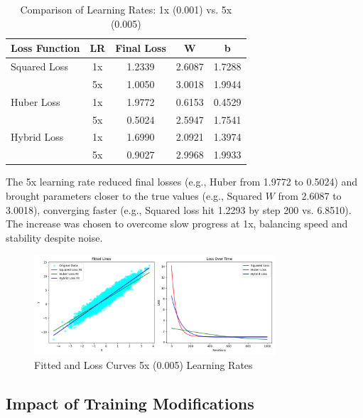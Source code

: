 \documentclass{article}
\begin{document}
\begin{table}[H]
    \centering
    \caption{Comparison of Learning Rates: 1x (0.001) vs. 5x (0.005)}
    \label{tab:lr_comparison}
    \begin{tabular}{lcccc}
        \toprule
        \textbf{Loss Function} & \textbf{LR} & \textbf{Final Loss} & \textbf{W} & \textbf{b} \\
        \midrule
        Squared Loss & 1x  & 1.2339 & 2.6087 & 1.7288 \\
                     & 5x  & 1.0050 & 3.0018 & 1.9944 \\
        Huber Loss   & 1x  & 1.9772 & 0.6153 & 0.4529 \\
                     & 5x  & 0.5024 & 2.5947 & 1.7541 \\
        Hybrid Loss  & 1x  & 1.6990 & 2.0921 & 1.3974 \\
                     & 5x  & 0.9027 & 2.9968 & 1.9933 \\
        \bottomrule
    \end{tabular}
\end{table}

The 5x learning rate reduced final losses (e.g., Huber from 1.9772 to 0.5024) and brought parameters closer to the true values (e.g., Squared \( W \) from 2.6087 to 3.0018), converging faster (e.g., Squared loss hit 1.2293 by step 200 vs. 6.8510). The increase was chosen to overcome slow progress at 1x, balancing speed and stability despite noise.

\begin{figure}[H]
    \centering
    \includegraphics[width=0.8\textwidth]{assets/bigger_learning_rate.png}
    \caption{Fitted and Loss Curves 5x (0.005) Learning Rates}
    \label{fig:bigger_learning_rate}
\end{figure}

\subsection{Impact of Training Modifications}
\end{document}
